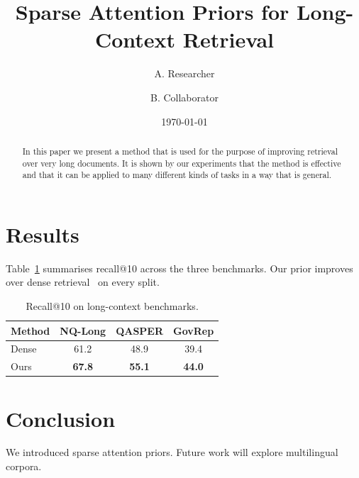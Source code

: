 \documentclass[11pt]{article}
\title{Sparse Attention Priors for Long-Context Retrieval}
\author{A. Researcher \and B. Collaborator}
\date{\today}
\begin{document}
\maketitle

\begin{abstract}
In this paper we present a method that is used for the purpose of improving retrieval
over very long documents. It is shown by our experiments that the method is effective
and that it can be applied to many different kinds of tasks in a way that is general.
\end{abstract}




\section{Results}
\label{sec:results}
Table~\ref{tab:main} summarises recall@10 across the three benchmarks. Our prior
improves over dense retrieval~\cite{karpukhin2020dense} on every split.

\begin{table}[t]
  \centering
  \caption{Recall@10 on long-context benchmarks.}
  \label{tab:main}
  \begin{tabular}{lccc}
    \hline
    Method & NQ-Long & QASPER & GovRep \\
    \hline
    Dense  & 61.2 & 48.9 & 39.4 \\
    Ours   & \textbf{67.8} & \textbf{55.1} & \textbf{44.0} \\
    \hline
  \end{tabular}
\end{table}

\section{Conclusion}
\label{sec:conclusion}
We introduced sparse attention priors. Future work will explore multilingual corpora.



\end{document}
